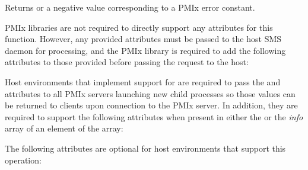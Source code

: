Returns  or a negative value corresponding to a PMIx error constant.

\reqattrstart
\ac{PMIx} libraries are not required to directly support any attributes for this function. However, any provided attributes must be passed to the host \ac{SMS} daemon for processing, and the \ac{PMIx} library is required to add the following attributes to those provided before passing the request to the host:


Host environments that implement support for  are required to pass the  and  attributes to all \ac{PMIx} servers launching new child processes so those values can be returned to clients upon connection to the \ac{PMIx} server. In addition, they are required to support the following attributes when present in either the  or the \textit{info} array of an element of the  array:


\reqattrend

\optattrstart
The following attributes are optional for host environments that support this operation:


